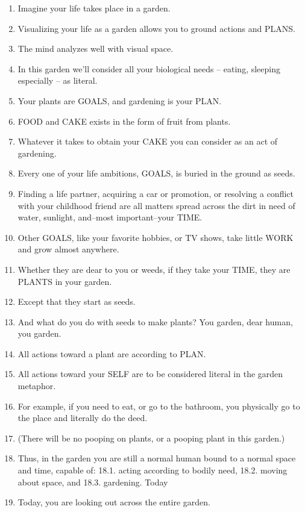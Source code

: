 \documentclass[
]{book}
\begin{document}
\begin{enumerate}
\def\labelenumi{\arabic{enumi}.}
\item
  Imagine your life takes place in a garden.
\item
  Visualizing your life as a garden allows you to ground actions and PLANS.
\item
  The mind analyzes well with visual space.
\item
  In this garden we'll consider all your biological needs -- eating, sleeping especially -- as literal.
\item
  Your plants are GOALS, and gardening is your PLAN.
\item
  FOOD and CAKE exists in the form of fruit from plants.
\item
  Whatever it takes to obtain your CAKE you can consider as an act of gardening.
\item
  Every one of your life ambitions, GOALS, is buried in the ground as seeds.
\item
  Finding a life partner, acquiring a car or promotion, or resolving a conflict with
  your childhood friend are all matters spread across the dirt in need of water,
  sunlight, and--most important--your TIME.
\item
  Other GOALS, like your favorite hobbies, or TV shows, take little WORK and
  grow almost anywhere.
\item
  Whether they are dear to you or weeds, if they take your TIME, they are PLANTS
  in your garden.
\item
  Except that they start as seeds.
\item
  And what do you do with seeds to make plants? You garden, dear human, you
  garden.
\item
  All actions toward a plant are according to PLAN.
\item
  All actions toward your SELF are to be considered literal in the garden
  metaphor.
\item
  For example, if you need to eat, or go to the bathroom, you physically go to the
  place and literally do the deed.
\item
  (There will be no pooping on plants, or a pooping plant in this garden.)
\item
  Thus, in the garden you are still a normal human bound to a normal space and
  time, capable of:
  18.1. acting according to bodily need,
  18.2. moving about space, and
  18.3. gardening.
  Today
\item
  Today, you are looking out across the entire garden.

\end{enumerate}
\end{document}
